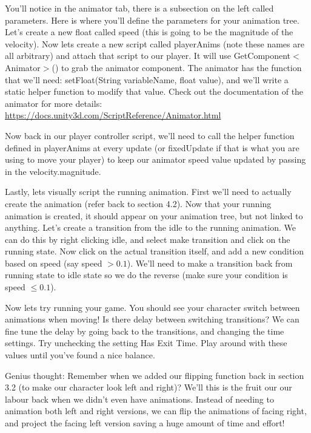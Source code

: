 \documentclass[12pt]{article}
\begin{document}
You'll notice in the animator tab, there is a subsection on the left called parameters. Here is where you'll define the parameters for your animation tree. Let's create a new float called speed (this is going to be the magnitude of the velocity). Now lets create a new script called playerAnims (note these names are all arbitrary) and attach that script to our player. It will use GetComponent$<$Animator$>$() to grab the animator component. The animator has the function that we'll need: setFloat(String variableName, float value), and we'll write a static helper function to modify that value. Check out the documentation of the animator for more details: \url{https://docs.unity3d.com/ScriptReference/Animator.html}    

Now back in our player controller script, we'll need to call the helper function defined in playerAnims at every update (or fixedUpdate if that is what you are using to move your player) to keep our animator speed value updated by passing in the velocity.magnitude.

Lastly, lets visually script the running animation. First we'll need to actually create the animation (refer back to section 4.2). Now that your running animation is created, it should appear on your animation tree, but not linked to anything. Let's create a transition from the idle to the running animation. We can do this by right clicking idle, and select make transition and click on the running state. Now click on the actual transition itself, and add a new condition based on speed (say speed $> 0.1$). We'll need to make a transition back from running state to idle state so we do the reverse (make sure your condition is speed $\leq 0.1$). 

Now lets try running your game. You should see your character switch between animations when moving! Is there delay between switching transitions? We can fine tune the delay by going back to the transitions, and changing the time settings. Try unchecking the setting Has Exit Time. Play around with these values until you've found a nice balance. 

Genius thought: Remember when we added our flipping function back in section 3.2 (to make our character look left and right)? We'll this is the fruit our our labour back when we didn't even have animations. Instead of needing to animation both left and right versions, we can flip the animations of facing right, and project the facing left version saving a huge amount of time and effort!
\end{document}
